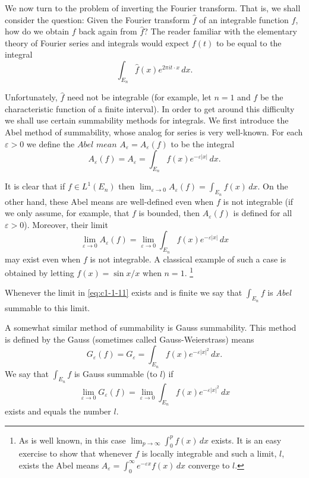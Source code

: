 We now turn to the problem of inverting the Fourier transform. That is, we
shall consider the question: Given the Fourier transform $\hat{f}$ of an
integrable function $f$, how do we obtain $f$ back again from $\hat{f}$? The
reader familiar with the elementary theory of Fourier series and integrals would
expect $f(t)$ to be equal to the integral
\begin{equation}\label{eq:c1-1-10}
\int_{E_{n}}\hat{f}(x)e^{2\pi i t\cdot x}\,dx.
\end{equation}

Unfortunately, $\hat{f}$ need not be integrable (for example, let $n = 1$ and
$f$ be the characteristic function of a finite interval). In order to get around
this difficulty we shall use certain summability methods for integrals. We first
introduce the Abel method of summability, whose analog for series is very
well-known. For each $\varepsilon > 0$ we define the $Abel$ $mean$
$A_{\varepsilon} = A_{\varepsilon}(f)$ to be the integral
\[
A_{\varepsilon}(f)=A_{\varepsilon}=\int_{E_{n}}f(x)e^{-\varepsilon|x|}\,dx.
\]

It is clear that if $f \in L^{1}(E_{n})$ then
$\lim_{\varepsilon \to 0} A_{\varepsilon}(f) = \int_{E_{n}} f(x) \, dx$. On the
other hand, these Abel means are well-defined even when $f$ is not integrable
(if we only assume, for example, that $f$ is bounded, then
$A_{\varepsilon}(f)$ is defined for all $\varepsilon > 0$). Moreover, their
limit
\begin{equation}\label{eq:c1-1-11}
\lim_{\varepsilon\to0}A_{\varepsilon}(f)
=\lim_{\varepsilon\to0}\int_{E_{n}}f(x)e^{-\varepsilon|x|}\,dx
\end{equation}
may exist even when $f$ is not integrable. A classical example of such a case is
obtained by letting $f(x) = \sin x/x$ when $n = 1$.%
\footnote{As is well known, in this case
$\lim_{p\to\infty}\int_{0}^{p}f(x)\,dx$ exists. It is an easy exercise to show
that whenever $f$ is locally integrable and such a limit, $l$, exists the Abel
means $A_{\varepsilon}=\int_{0}^{\infty}e^{-\varepsilon x}f(x)\,dx$ converge to
$l$.}

Whenever the limit in \eqref{eq:c1-1-11} exists and is finite we say that
$\int_{E_{n}} f$ is \textit{Abel} summable to this limit.

A somewhat similar method of summability is Gauss summability. This method is
defined by the Gauss (sometimes called Gauss-Weierstrass) means
\[
G_{\varepsilon}(f)=G_{\varepsilon}=\int_{E_{n}}f(x)e^{-\varepsilon|x|^{2}}\,dx.
\]
We say that $\int_{E_{n}} f$ is Gauss summable (to $l$) if
\begin{equation}\label{eq:c1-1-11p}
\tag{1.11$'$}
\lim_{\varepsilon\to0}G_{\varepsilon}(f)
=\lim_{\varepsilon\to0}\int_{E_{n}}f(x)e^{-\varepsilon|x|^{2}}\,dx
\end{equation}
exists and equals the number $l$.

